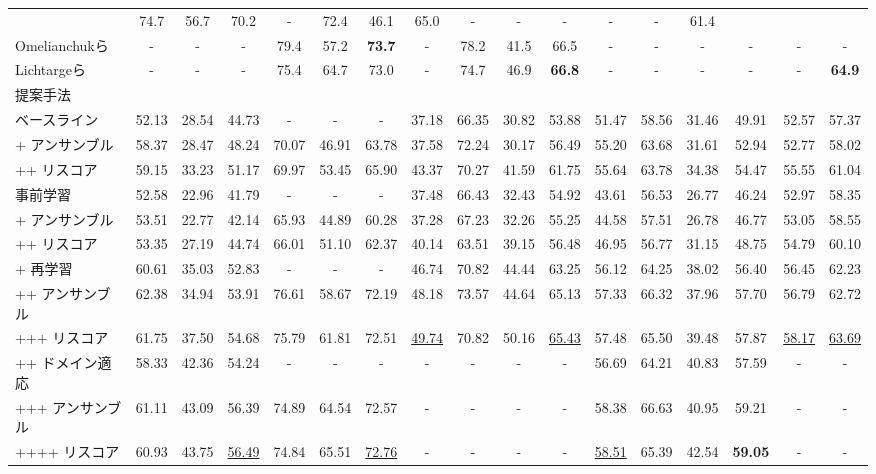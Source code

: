 \documentclass[
  platex, dvipdfmx %
]{nlp2021}
\begin{document}
\begin{table*}[t]
\begin{tabular}{@{\extracolsep{2.5pt}}l ccc ccc|c ccc|cccc|cc@{}}
		& 74.7 & 56.7 & 70.2
		& - & 72.4 & 46.1 & 65.0
		& - & - & - & -
		& - & 61.4 \\
		Omelianchukら ~\cite{omelianchuk-etal-2020-gector}
		& - & - & -
		& 79.4 & 57.2 & \textbf{73.7}
		& - & 78.2 & 41.5 & 66.5
		& - & - & - & -
		& - & - \\
		Lichtargeら ~\cite{lichtarge-etal-2020-data}
		& - & - & -
		& 75.4 & 64.7 & 73.0
		& - & 74.7 & 46.9 & \textbf{66.8}
		& - & - & - & -
		& - & \textbf{64.9} \\
		\hline
		\hline
		提案手法 \\
		ベースライン
		& 52.13 & 28.54 & 44.73 
		& - & - & - 
		& 37.18 & 66.35 & 30.82 & 53.88 
		& 51.47 & 58.56 & 31.46 & 49.91 
		& 52.57 & 57.37 \\
		+ アンサンブル
		& 58.37 & 28.47 & 48.24 
		& 70.07 & 46.91 & 63.78 
		& 37.58 & 72.24 & 30.17 & 56.49 
		& 55.20 & 63.68 & 31.61 & 52.94 
		& 52.77 & 58.02 \\
		++ リスコア
		& 59.15 & 33.23 & 51.17 
		& 69.97 & 53.45 & 65.90 
		& 43.37 & 70.27 & 41.59 & 61.75 
		& 55.64 & 63.78 & 34.38 & 54.47 
		& 55.55 & 61.04 \\
		\hline
		事前学習
		& 52.58 & 22.96 & 41.79 
		& - & - & - 
		& 37.48 & 66.43 & 32.43 & 54.92 
		& 43.61 & 56.53 & 26.77 & 46.24 
		& 52.97 & 58.35 \\
		+ アンサンブル
		& 53.51 & 22.77 & 42.14 
		& 65.93 & 44.89 & 60.28 
		& 37.28 & 67.23 & 32.26 & 55.25 
		& 44.58 & 57.51 & 26.78 & 46.77 
		& 53.05 & 58.55 \\
		++ リスコア
		& 53.35 & 27.19 & 44.74 
		& 66.01 & 51.10 & 62.37 
		& 40.14 & 63.51 & 39.15 & 56.48 
		& 46.95 & 56.77 & 31.15 & 48.75 
		& 54.79 & 60.10 \\
		\hline
		+ 再学習
		& 60.61 & 35.03 & 52.83 
		& - & - & - 
		& 46.74 & 70.82 & 44.44 & 63.25 
		& 56.12 & 64.25 & 38.02 & 56.40 
		& 56.45 & 62.23 \\
		++ アンサンブル
		& 62.38 & 34.94 & 53.91 
		& 76.61 & 58.67 & 72.19 
		& 48.18 & 73.57 & 44.64 & 65.13 
		& 57.33 & 66.32 & 37.96 & 57.70 
		& 56.79 & 62.72 \\
		+++ リスコア
		& 61.75 & 37.50 & 54.68 
		& 75.79 & 61.81 & 72.51 
		& \underline{49.74} & 70.82 & 50.16 & \underline{65.43} 
		& 57.48 & 65.50 & 39.48 & 57.87 
		& \underline{58.17} & \underline{63.69} \\
		\hline
		++ ドメイン適応
		& 58.33 & 42.36 & 54.24 
		& - & - & - 
		& - & - & - & - 
		& 56.69 & 64.21 & 40.83 & 57.59 
		& - & - \\
		+++ アンサンブル
		& 61.11 & 43.09 & 56.39 
		& 74.89 & 64.54 & 72.57 
		& - & - & - & - 
		& 58.38 & 66.63 & 40.95 & 59.21 
		& - & - \\
		++++ リスコア
		& 60.93 & 43.75 & \underline{56.49} 
		& 74.84 & 65.51 & \underline{72.76} 
		& - & - & - & -
		& \underline{58.51} & 65.39 & 42.54 & \textbf{59.05} 
		& - & - \\
		\hline
	\end{tabular}
\end{table*}
\end{document}
